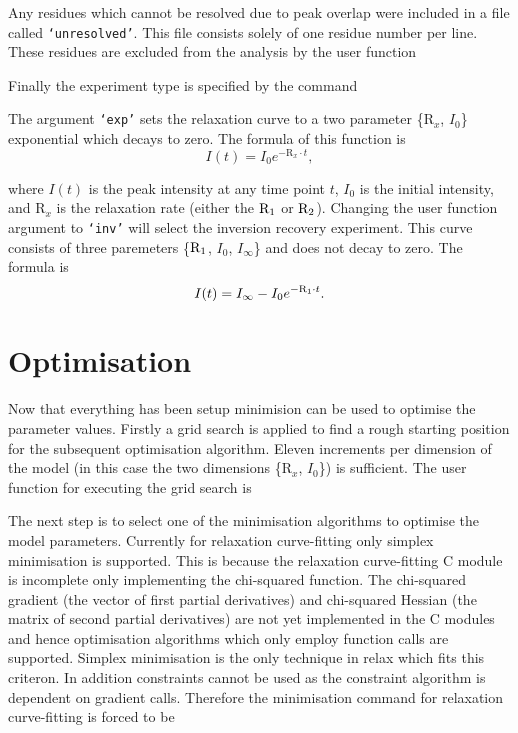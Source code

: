 
Any residues which cannot be resolved due to peak overlap were included in a file called \texttt{`unresolved'}.  This file consists solely of one residue number per line.  These residues are excluded from the analysis by the user function


Finally the experiment type is specified by the command


The argument \texttt{`exp'} sets the relaxation curve to a two parameter \{$\mathrm{R}_x$, $I_0$\} exponential which decays to zero.  The formula of this function is
\begin{equation}
 I(t) = I_0 e^{-\mathrm{R}_x \cdot t},
\end{equation}

\noindent where $I(t)$ is the peak intensity at any time point $t$, $I_0$ is the initial intensity, and $\mathrm{R}_x$ is the relaxation rate (either the $\mathrm{R}_1$ or $\mathrm{R}_2$).  Changing the user function argument to \texttt{`inv'} will select the inversion recovery experiment.  This curve consists of three paremeters \{$\mathrm{R}_1$, $I_0$, $I_{\infty}$\} and does not decay to zero.  The formula is
\begin{equation}
 I(t) = I_{\infty} - I_0 e^{-\mathrm{R}_1 \cdot t}.
\end{equation}




\section{Optimisation}

Now that everything has been setup minimision can be used to optimise the parameter values.  Firstly a grid search is applied to find a rough starting position for the subsequent optimisation algorithm.  Eleven increments per dimension of the model (in this case the two dimensions \{$\mathrm{R}_x$, $I_0$\}) is sufficient.  The user function for executing the grid search is


The next step is to select one of the minimisation algorithms to optimise the model parameters.  Currently for relaxation curve-fitting only simplex minimisation is supported.  This is because the relaxation curve-fitting C module is incomplete only implementing the chi-squared function.  The chi-squared gradient (the vector of first partial derivatives) and chi-squared Hessian (the matrix of second partial derivatives) are not yet implemented in the C modules and hence optimisation algorithms which only employ function calls are supported.  Simplex minimisation is the only technique in relax which fits this criteron.  In addition constraints cannot be used as the constraint algorithm is dependent on gradient calls.  Therefore the minimisation command for relaxation curve-fitting is forced to be

